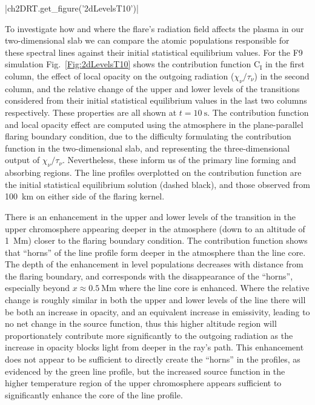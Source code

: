 \py[2DRT]|ch2DRT.get_figure('2dLevelsT10')|

To investigate how and where the flare's radiation field affects the plasma in our two-dimensional slab we can compare the atomic populations responsible for these spectral lines against their initial statistical equilibrium values.
For the F9 simulation Fig.~\ref{Fig:2dLevelsT10} shows the contribution function $\mathrm{C}_\mathrm{I}$ in the first column, the effect of local opacity on the outgoing radiation ($\chi_\nu/\tau_\nu$) in the second column, and the relative change of the upper and lower levels of the transitions considered from their initial statistical equilibrium values in the last two columns respectively.
These properties are all shown at $t=\SI{10}{\second}$.
The contribution function and local opacity effect are computed using the atmosphere in the plane-parallel flaring boundary condition, due to the difficulty formulating the contribution function in the two-dimensional slab, and representing the three-dimensional output of $\chi_\nu/\tau_\nu$.
Nevertheless, these inform us of the primary line forming and absorbing regions.
The line profiles overplotted on the contribution function are the initial statistical equilibrium solution (dashed black), and those observed from \SI{100}{\kilo\metre} on either side of the flaring kernel.

There is an enhancement in the upper and lower levels of the \Ha{} transition in the upper chromosphere appearing deeper in the atmosphere (down to an altitude of \SI{1}{\mega\metre}) closer to the flaring boundary condition.
The contribution function shows that ``horns'' of the \Ha{} line profile form deeper in the atmosphere than the line core.
The depth of the enhancement in level populations decreases with distance from the flaring boundary, and corresponds with the disappearance of the ``horns'', especially beyond $x\approx\SI{0.5}{\mega\metre}$ where the line core is enhanced.
Where the relative change is roughly similar in both the upper and lower levels of the \Ha{} line there will be both an increase in opacity, and an equivalent increase in emissivity, leading to no net change in the source function, thus this higher altitude region will proportionately contribute more significantly to the outgoing radiation as the increase in opacity blocks light from deeper in the ray's path.
This enhancement does not appear to be sufficient to directly create the ``horns'' in the \Ha{} profiles, as evidenced by the green line profile, but the increased source function in the higher temperature region of the upper chromosphere appears sufficient to significantly enhance the core of the line profile.

